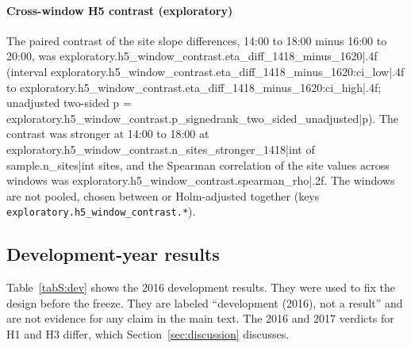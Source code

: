 \paragraph{Cross-window H5 contrast (exploratory)} The paired contrast of the site slope differences, 14:00 to 18:00 minus 16:00 to 20:00, was {{exploratory.h5_window_contrast.eta_diff_1418_minus_1620|.4f}} (interval {{exploratory.h5_window_contrast.eta_diff_1418_minus_1620:ci_low|.4f}} to {{exploratory.h5_window_contrast.eta_diff_1418_minus_1620:ci_high|.4f}}; unadjusted two-sided p = {{exploratory.h5_window_contrast.p_signedrank_two_sided_unadjusted|p}}). The contrast was stronger at 14:00 to 18:00 at {{exploratory.h5_window_contrast.n_sites_stronger_1418|int}} of {{sample.n_sites|int}} sites, and the Spearman correlation of the site values across windows was {{exploratory.h5_window_contrast.spearman_rho|.2f}}. The windows are not pooled, chosen between or Holm-adjusted together (keys \texttt{exploratory.h5\_window\_contrast.*}).


\subsection{Development-year results}\label{sec:S1:devtable}

Table~\ref{tabS:dev} shows the 2016 development results. They were used to fix the design before the freeze. They are labeled ``development (2016), not a result'' and are not evidence for any claim in the main text. The 2016 and 2017 verdicts for H1 and H3 differ, which Section~\ref{sec:discussion} discusses.

